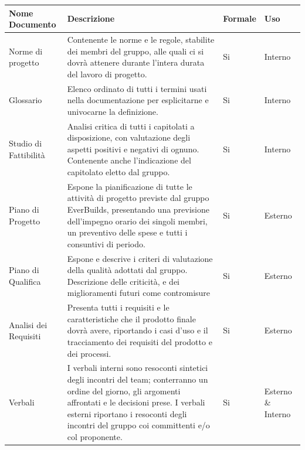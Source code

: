 			\begin{center}
				\begin{longtable}{|p{3.5cm}|p{5cm}|p{2cm}|p{3cm}|}
					\hline
					\rowcolor{lighter-grayer}
					\textbf{Nome Documento} & \textbf{Descrizione} & \textbf{Formale} & \textbf{Uso}\\
					\hline
					\endfirsthead
					Norme di progetto & Contenente le norme e le regole, stabilite dei membri del gruppo, alle quali ci si dovrà attenere durante l’intera durata del lavoro di progetto. & Si & Interno \\
					\hline
					Glossario & Elenco ordinato di tutti i termini usati nella documentazione per esplicitarne e univocarne la definizione. & Si & Interno \\
					\hline
					Studio di Fattibilità & Analisi critica di tutti i capitolati a disposizione, con valutazione degli aspetti positivi e negativi di ognuno. Contenente anche l’indicazione del capitolato eletto dal gruppo. & Si & Interno \\
					\hline
					Piano di Progetto & Espone la pianificazione di tutte le attività di progetto previste dal gruppo EverBuilds, presentando una previsione dell’impegno orario dei singoli membri, un preventivo delle spese e tutti i consuntivi di periodo. & Si & Esterno \\
					\hline
					Piano di Qualifica & Espone e descrive i criteri di valutazione della qualità adottati dal gruppo. \newline Descrizione delle criticità, e dei miglioramenti futuri come contromisure & Si & Esterno \\
					\hline
					Analisi dei Requisiti & Presenta tutti i requisiti e le caratteristiche che il prodotto finale dovrà avere, riportando i casi d’uso e il tracciamento dei requisiti del prodotto e dei processi. & Si & Esterno \\
					\hline
					Verbali & I verbali interni sono resoconti sintetici degli incontri del team; conterranno un ordine del giorno, gli argomenti affrontati e le decisioni prese. \newline I verbali esterni riportano i resoconti degli incontri del gruppo coi committenti e/o col proponente. & Si & Esterno \& Interno  \\
					\hline
				\end{longtable}
			\end{center}
